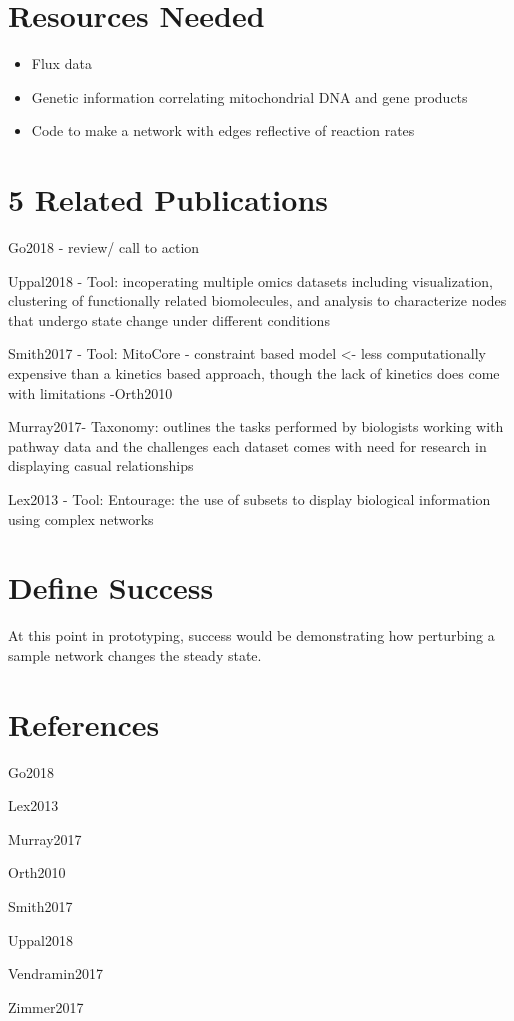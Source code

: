 \documentclass{proc}	%
\begin{document}
\section{Resources Needed}
\begin{itemize}
  \item Flux data
  \item Genetic information correlating mitochondrial DNA and gene products
  \item Code to make a network with edges reflective of reaction rates
\end{itemize}

\section{5 Related Publications}

Go2018 - review/ call to action

Uppal2018 - Tool: incoperating multiple omics datasets including visualization, clustering of functionally related biomolecules, and analysis to characterize nodes that undergo state change under different conditions

Smith2017 - Tool: MitoCore - constraint based model <- less computationally expensive than a kinetics based approach, though the lack of kinetics does come with limitations -Orth2010

Murray2017- Taxonomy: outlines the tasks performed by biologists working with pathway data and the challenges each dataset comes with 
need for research in displaying casual relationships

Lex2013 - Tool: Entourage: the use of subsets to display biological information using complex networks

\section{Define Success}
At this point in prototyping, success would be demonstrating how perturbing a sample network changes the steady state.

\section{References}

Go2018

Lex2013

Murray2017

Orth2010

Smith2017

Uppal2018

Vendramin2017

Zimmer2017
\end{document}
